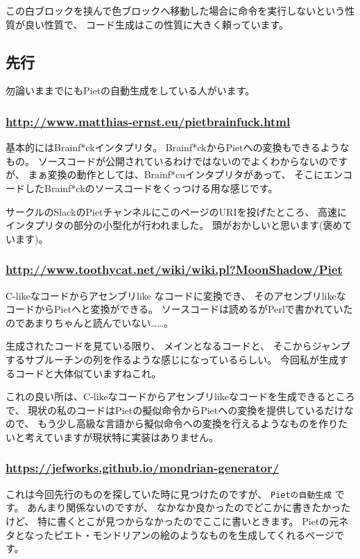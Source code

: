 この白ブロックを挟んで色ブロックへ移動した場合に命令を実行しないという性質が良い性質で、
コード生成はこの性質に大きく頼っています。

\subsection{先行}

勿論いままでにもPietの自動生成をしている人がいます。

\subsubsection{\url{http://www.matthias-ernst.eu/pietbrainfuck.html}}

基本的にはBrainf*ckインタプリタ。
Brainf*ckからPietへの変換もできるようなもの。
ソースコードが公開されているわけではないのでよくわからないのですが、
まぁ変換の動作としては、Brainf*cuインタプリタがあって、
そこにエンコードしたBrainf*ckのソースコードをくっつける用な感じです。

サークルのSlackのPietチャンネルにこのページのURIを投げたところ、
高速にインタプリタの部分の小型化が行われました。
頭がおかしいと思います(褒めています)。

\subsubsection{\url{http://www.toothycat.net/wiki/wiki.pl?MoonShadow/Piet}}

C-likeなコードからアセンブリlike なコードに変換でき、 そのアセンブリlikeなコードからPietへと変換ができる。
ソースコードは読めるがPerlで書かれていたのであまりちゃんと読んでいない\dots\dots。

生成されたコードを見ている限り、 メインとなるコードと、
そこからジャンプするサブルーチンの列を作るような感じになっているらしい。
今回私が生成するコードと大体似ていますねこれ。

これの良い所は、C-likeなコードからアセンブリlikeなコードを生成できるところで、
現状の私のコードはPietの擬似命令からPietへの変換を提供しているだけなので、
もう少し高級な言語から擬似命令への変換を行えるようなものを作りたいと考えていますが現状特に実装はありません。

\subsubsection{\url{https://jefworks.github.io/mondrian-generator/}}

これは今回先行のものを探していた時に見つけたのですが、
\texttt{Pietの自動生成} です。 あんまり関係ないのですが、
なかなか良かったのでどこかに書きたかったけど、
特に書くとこが見つからなかったのでここに書いときます。
Pietの元ネタとなったピエト・モンドリアンの絵のようなものを生成してくれるページです。

